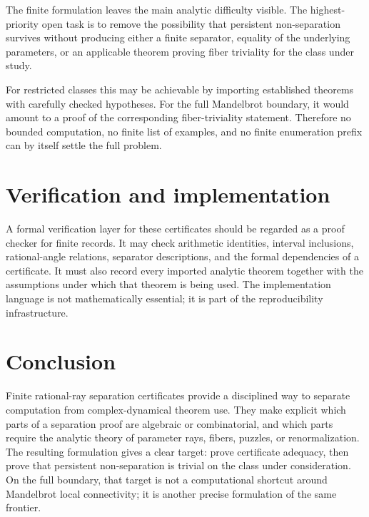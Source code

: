 \documentclass[11pt]{amsart}
\begin{document}
The finite formulation leaves the main analytic difficulty visible.  The highest-priority open task is to remove the possibility that persistent non-separation survives without producing either a finite separator, equality of the underlying parameters, or an applicable theorem proving fiber triviality for the class under study.

For restricted classes this may be achievable by importing established theorems with carefully checked hypotheses.  For the full Mandelbrot boundary, it would amount to a proof of the corresponding fiber-triviality statement.  Therefore no bounded computation, no finite list of examples, and no finite enumeration prefix can by itself settle the full problem.

\section{Verification and implementation}

A formal verification layer for these certificates should be regarded as a proof checker for finite records.  It may check arithmetic identities, interval inclusions, rational-angle relations, separator descriptions, and the formal dependencies of a certificate.  It must also record every imported analytic theorem together with the assumptions under which that theorem is being used.  The implementation language is not mathematically essential; it is part of the reproducibility infrastructure.

\section{Conclusion}

Finite rational-ray separation certificates provide a disciplined way to separate computation from complex-dynamical theorem use.  They make explicit which parts of a separation proof are algebraic or combinatorial, and which parts require the analytic theory of parameter rays, fibers, puzzles, or renormalization.  The resulting formulation gives a clear target: prove certificate adequacy, then prove that persistent non-separation is trivial on the class under consideration.  On the full boundary, that target is not a computational shortcut around Mandelbrot local connectivity; it is another precise formulation of the same frontier.



\end{document}
